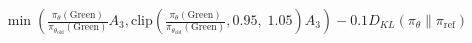 \documentclass[preview]{standalone}
\begin{document}
\begin{align*}
\min \left(\frac{\pi_\theta(\text{Green})}{\pi_{\theta_{\text{old}}}(\text{Green})} A_3, \text{clip} \left( \frac{\pi_\theta(\text{Green})}{\pi_{\theta_{\text{old}}}(\text{Green})}, 0.95,\; 1.05 \right) A_3 \right) - 0.1 D_{KL}(\pi_\theta \parallel \pi_{\text{ref}})
\end{align*}
\end{document}
